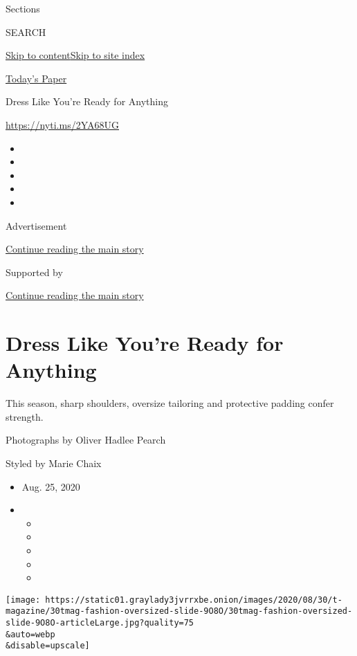 Sections

SEARCH

\protect\hyperlink{site-content}{Skip to
content}\protect\hyperlink{site-index}{Skip to site index}

\href{https://myaccount.nytimes3xbfgragh.onion/auth/login?response_type=cookie\&client_id=vi}{}

\href{https://www.nytimes3xbfgragh.onion/section/todayspaper}{Today's
Paper}

Dress Like You're Ready for Anything

\url{https://nyti.ms/2YA68UG}

\begin{itemize}
\item
\item
\item
\item
\item
\end{itemize}

Advertisement

\protect\hyperlink{after-top}{Continue reading the main story}

Supported by

\protect\hyperlink{after-sponsor}{Continue reading the main story}

\hypertarget{dress-like-youre-ready-for-anything}{%
\section{Dress Like You're Ready for
Anything}\label{dress-like-youre-ready-for-anything}}

This season, sharp shoulders, oversize tailoring and protective padding
confer strength.

Photographs by Oliver Hadlee Pearch

Styled by Marie Chaix

\begin{itemize}
\item
  Aug. 25, 2020
\item
  \begin{itemize}
  \item
  \item
  \item
  \item
  \item
  \end{itemize}
\end{itemize}

\texttt{[image: https://static01.graylady3jvrrxbe.onion/images/2020/08/30/t-magazine/30tmag-fashion-oversized-slide-9O8O/30tmag-fashion-oversized-slide-9O8O-articleLarge.jpg?quality=75\\\&auto=webp\\\&disable=upscale]}

